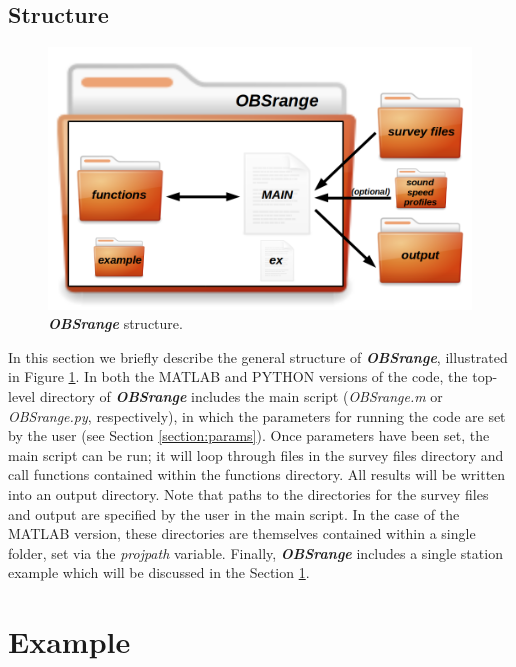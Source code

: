 \documentclass[titlepage, 12pt]{article}
\begin{document}
  \subsection{Structure}
   
   \begin{figure}[!htb]
    \includegraphics[width=\linewidth]{OBSrange_structure.png}
    \caption{\textbf{\textit{OBSrange}} structure.}
    \label{fig:struct}
   \end{figure}

   In this section we briefly describe the general structure of \textbf{\textit{OBSrange}},  illustrated in Figure \ref{fig:struct}. In both the MATLAB and PYTHON versions of the code, the top-level directory of \textbf{\textit{OBSrange}} includes the main script (\textit{OBSrange.m} or \textit{OBSrange.py}, respectively), in which the parameters for running the code are set by the user (see Section \ref{section:params}). Once parameters have been set, the main script can be run; it will loop through files in the survey files directory and call functions contained within the functions directory. All results will be written into an output directory. Note that paths to the directories for the survey files and output are specified by the user in the main script. In the case of the MATLAB version, these directories are themselves contained within a single folder, set via the \textit{projpath} variable. Finally, \textbf{\textit{OBSrange}} includes a single station example which will be discussed in the Section \ref{section:ex}.

 
 \section{Example}
 \label{section:ex}
\end{document}
